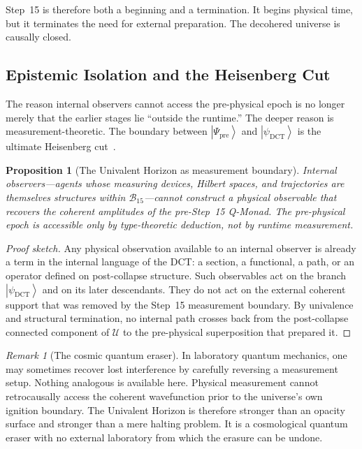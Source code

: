 \documentclass[11pt,a4paper]{article}
\theoremstyle{plain}
\newtheorem{proposition}[theorem]{Proposition}
\theoremstyle{definition}
\theoremstyle{remark}
\newtheorem{remark}[theorem]{Remark}
\newcommand{\U}{\mathcal{U}}
\newcommand{\B}{\mathcal{B}}
\providecommand{\ket}[1]{\left|#1\right\rangle}
\begin{document}
Step~15 is therefore both a beginning and a termination.
It begins physical time, but it terminates the need for external preparation.
The decohered universe is causally closed.

\subsection{Epistemic Isolation and the Heisenberg Cut}
\label{sec:epistemic}

The reason internal observers cannot access the pre-physical epoch is no longer merely that the earlier stages lie ``outside the runtime.''
The deeper reason is measurement-theoretic.
The boundary between $\ket{\Psi_{\mathrm{pre}}}$ and $\ket{\psi_{\mathrm{DCT}}}$ is the ultimate Heisenberg cut~\cite{von-neumann,schlosshauer}.

\begin{proposition}[The Univalent Horizon as measurement boundary]
\label{prop:epistemic}
Internal observers---agents whose measuring devices, Hilbert spaces, and trajectories are themselves structures within $\B_{15}$---cannot construct a physical observable that recovers the coherent amplitudes of the pre-Step~15 Q-Monad.
The pre-physical epoch is accessible only by type-theoretic deduction, not by runtime measurement.
\end{proposition}

\begin{proof}[Proof sketch]
Any physical observation available to an internal observer is already a term in the internal language of the DCT: a section, a functional, a path, or an operator defined on post-collapse structure.
Such observables act on the branch $\ket{\psi_{\mathrm{DCT}}}$ and on its later descendants.
They do not act on the external coherent support that was removed by the Step~15 measurement boundary.
By univalence and structural termination, no internal path crosses back from the post-collapse connected component of $\U$ to the pre-physical superposition that prepared it.
\end{proof}

\begin{remark}[The cosmic quantum eraser]
\label{rem:planck}
In laboratory quantum mechanics, one may sometimes recover lost interference by carefully reversing a measurement setup.
Nothing analogous is available here.
Physical measurement cannot retrocausally access the coherent wavefunction prior to the universe's own ignition boundary.
The Univalent Horizon is therefore stronger than an opacity surface and stronger than a mere halting problem.
It is a cosmological quantum eraser with no external laboratory from which the erasure can be undone.
\end{remark}
\end{document}
